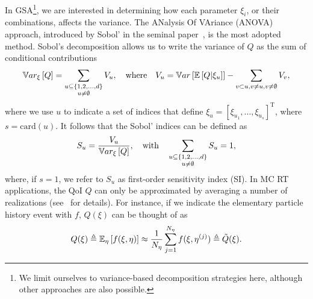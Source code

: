 In GSA\footnote{We limit ourselves to variance-based decomposition strategies here, although other approaches are also possible.}, %
we are interested in determining how each parameter $\xi_i$, or their combinations, affects the variance. The ANalysis Of VAriance (ANOVA) approach, introduced by Sobol' in the seminal paper~\cite{sobol}, is the most adopted method. %
Sobol's decomposition allows us to write the variance of $Q$ as the sum of conditional contributions~\cite{Crestaux2009}
\begin{equation}\label{eq:conditional-var}
 \mathbb{V}ar_\xi\left[Q\right] = \sum_{\substack{u \subseteq \left\{ 1, 2, \dots, d \right\} \\ u \neq \emptyset}} V_u, \quad \mathrm{where} \quad 
 V_u = \mathbb{V}ar\left[ \mathbb{E}\left[ Q | \xi_u \right] \right] - \sum_{ \substack{ v \subset u, v \neq u,  v \neq \emptyset } } V_v,
\end{equation}
where we use $u$ to indicate a set of indices that define $\xi_u = \left[ \xi_{u_1}, \dots, \xi_{u_s} \right]^{\mathrm{T}}$, where $s = \mathrm{card}(u)$. It follows that the Sobol' indices can be defined as 
\begin{equation}\label{eq:si}
 S_u = \frac{V_u}{\mathbb{V}ar_\xi\left[Q\right]}, \quad \mathrm{with} \quad 
 \sum_{ \substack{ u \subseteq \left\{ 1, 2, \dots, d \right\} \\ u \neq \emptyset } } S_u = 1,
\end{equation}
where, if $s=1$, we refer to $S_u$ as first-order sensitivity index (SI).
%
In MC RT applications, %
the QoI $Q$ can only be approximated by averaging a number of realizations (see~\cite{ClementsANS2022} for details). For instance, if we indicate the elementary particle history event with $f$, $Q(\xi)$ can be thought of as
\begin{equation}
 Q(\xi) \triangleq \mathbb{E}_\eta\left[ f(\xi,\eta) \right] \approx \frac{1}{{N_\eta}} \sum_{j=1}^{{N_\eta}} f( \xi, \eta^{(j)} ) \triangleq \tilde{Q}(\xi).
\end{equation}

